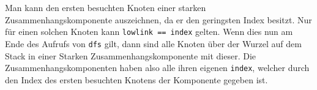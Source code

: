 \documentclass[11pt]{article}
\begin{document}
\begin{enumerate}[a)]
        Man kann den ersten besuchten Knoten einer starken
        Zusammenhangskomponente auszeichnen, da er den geringsten Index
        besitzt. Nur f\"ur einen solchen Knoten kann \texttt{lowlink  == index}
        gelten. Wenn dies nun am Ende des Aufrufs von \texttt{dfs} gilt, dann
        sind alle Knoten \"uber der Wurzel auf dem Stack in einer Starken
        Zusammenhangskomponente mit dieser. Die Zusammenhangskomponenten haben
        also alle ihren eigenen \texttt{index}, welcher durch den Index des
        ersten besuchten Knotens der Komponente gegeben ist.







\end{enumerate} 
\end{document}
